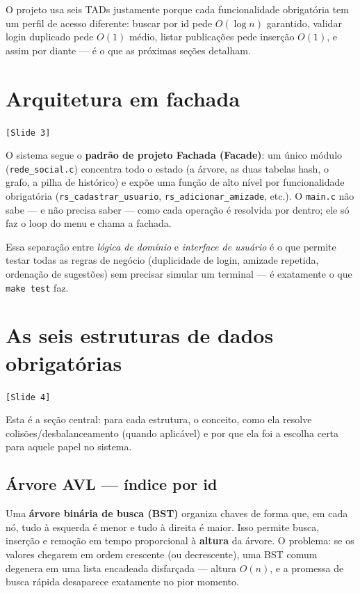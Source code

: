 \documentclass[11pt,a4paper]{article}
\newcommand{\slideref}[1]{\textcolor{accentwarm}{\texttt{[Slide #1]}}}
\newcommand{\code}[1]{\texttt{#1}}
\begin{document}
O projeto usa seis TADs justamente porque cada funcionalidade obrigatória tem
um perfil de acesso diferente: buscar por id pede $O(\log n)$ garantido,
validar login duplicado pede $O(1)$ médio, listar publicações pede inserção
$O(1)$, e assim por diante --- é o que as próximas seções detalham.

\section{Arquitetura em fachada}
\slideref{3}

O sistema segue o \textbf{padrão de projeto Fachada (Facade)}: um único
módulo (\code{rede\_social.c}) concentra todo o estado (a árvore, as duas
tabelas hash, o grafo, a pilha de histórico) e expõe uma função de alto nível
por funcionalidade obrigatória (\code{rs\_cadastrar\_usuario},
\code{rs\_adicionar\_amizade}, etc.). O \code{main.c} não sabe --- e não
precisa saber --- como cada operação é resolvida por dentro; ele só faz o
loop do menu e chama a fachada.

Essa separação entre \emph{lógica de domínio} e \emph{interface de usuário} é
o que permite testar todas as regras de negócio (duplicidade de login,
amizade repetida, ordenação de sugestões) sem precisar simular um terminal
--- é exatamente o que \code{make test} faz.

\section{As seis estruturas de dados obrigatórias}
\slideref{4}

Esta é a seção central: para cada estrutura, o conceito, como ela resolve
colisões/desbalanceamento (quando aplicável) e por que ela foi a escolha
certa para aquele papel no sistema.

\subsection{Árvore AVL --- índice por id}

Uma \textbf{árvore binária de busca (BST)} organiza chaves de forma que, em
cada nó, tudo à esquerda é menor e tudo à direita é maior. Isso permite
busca, inserção e remoção em tempo proporcional à \textbf{altura} da árvore.
O problema: se os valores chegarem em ordem crescente (ou decrescente), uma
BST comum degenera em uma lista encadeada disfarçada --- altura $O(n)$, e a
promessa de busca rápida desaparece exatamente no pior momento.
\end{document}

